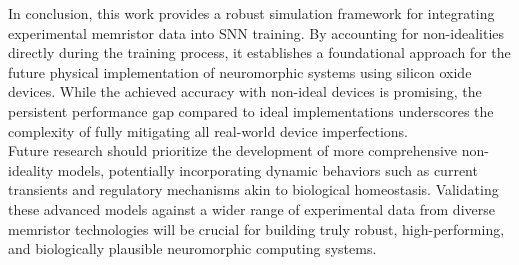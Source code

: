 \noindent In conclusion, this work provides a robust simulation framework for integrating experimental memristor data into SNN training. By accounting for non-idealities directly during the training process, it establishes a foundational approach for the future physical implementation of neuromorphic systems using silicon oxide devices. While the achieved accuracy with non-ideal devices is promising, the persistent performance gap compared to ideal implementations underscores the complexity of fully mitigating all real-world device imperfections.\\

\noindent Future research should prioritize the development of more comprehensive non-ideality models, potentially incorporating dynamic behaviors such as current transients and regulatory mechanisms akin to biological homeostasis. Validating these advanced models against a wider range of experimental data from diverse memristor technologies will be crucial for building truly robust, high-performing, and biologically plausible neuromorphic computing systems.